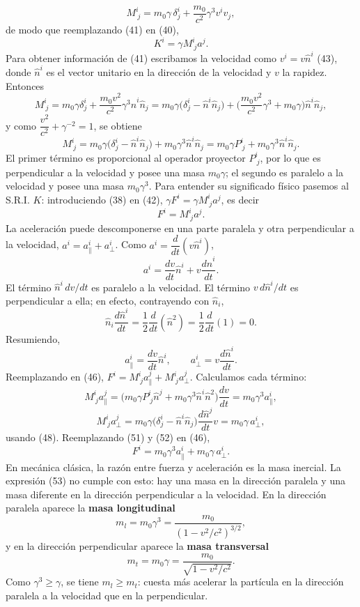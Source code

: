 \[
M^i_{\ j} = m_0\gamma\,\delta^i_j+\frac{m_0}{c^2}\gamma^3v^iv_j,
\tag{41}
\]
de modo que reemplazando (41) en (40),
\[
K^i = \gamma M^i_{\ j}a^j . \tag{42}
\]
Para obtener información de (41) escribamos la velocidad como
$v^i=v\hat n^i$ (43), donde $\hat n^i$ es el vector unitario en la
dirección de la velocidad y $v$ la rapidez. Entonces
\[
M^i_{\ j} = m_0\gamma\delta^i_j+\frac{m_0v^2}{c^2}\gamma^3\hat n^i\hat
n_j = m_0\gamma\big(\delta^i_j-\hat n^i\hat n_j\big)+\Big(\frac{m_0v^2}
{c^2}\gamma^3+m_0\gamma\Big)\hat n^i\hat n_j,
\]
y como $\dfrac{v^2}{c^2}+\gamma^{-2}=1$, se obtiene
\[
M^i_{\ j} = m_0\gamma\big(\delta^i_j-\hat n^i\hat n_j\big)+m_0\gamma^3
\hat n^i\hat n_j = m_0\gamma P^i_{\ j}+m_0\gamma^3\hat n^i\hat n_j .
\tag{44, 45}
\]
El primer término es proporcional al operador proyector $P^i_{\ j}$, por
lo que es perpendicular a la velocidad y posee una masa $m_0\gamma$; el
segundo es paralelo a la velocidad y posee una masa $m_0\gamma^3$. Para
entender su significado físico pasemos al S.R.I. $K$: introduciendo (38)
en (42), $\gamma F^i=\gamma M^i_{\ j}a^j$, es decir
\[
F^i = M^i_{\ j}a^j . \tag{46}
\]
La aceleración puede descomponerse en una parte paralela y otra
perpendicular a la velocidad, $a^i=a^i_\parallel+a^i_\perp$. Como
$a^i=\dfrac{d}{dt}(v\hat n^i)$,
\[
a^i = \frac{dv}{dt}\hat n^i+v\frac{d\hat n^i}{dt} . \tag{47}
\]
El término $\hat n^i\,dv/dt$ es paralelo a la velocidad. El término
$v\,d\hat n^i/dt$ es perpendicular a ella; en efecto, contrayendo con
$\hat n_i$,
\[
\hat n_i\frac{d\hat n^i}{dt} = \frac12\frac{d}{dt}(\hat n^2) = \frac12
\frac{d}{dt}(1) = 0. \tag{48}
\]
Resumiendo,
\[
a^i_\parallel = \frac{dv}{dt}\hat n^i, \qquad a^i_\perp = v\frac{d\hat
n^i}{dt}. \tag{49, 50}
\]
Reemplazando en (46), $F^i=M^i_{\ j}a^j_\parallel+M^i_{\ j}a^j_\perp$.
Calculamos cada término:
\[
M^i_{\ j}a^j_\parallel = \big(m_0\gamma P^i_{\ j}\hat n^j+m_0\gamma^3
\hat n^i\hat n^2\big)\frac{dv}{dt} = m_0\gamma^3a^i_\parallel, \tag{51}
\]
\[
M^i_{\ j}a^j_\perp = m_0\gamma\big(\delta^i_j-\hat n^i\hat n_j\big)
\frac{d\hat n^j}{dt}v = m_0\gamma\,a^i_\perp, \tag{52}
\]
usando (48). Reemplazando (51) y (52) en (46),
\[
F^i = m_0\gamma^3a^i_\parallel+m_0\gamma\,a^i_\perp . \tag{53}
\]
En mecánica clásica, la razón entre fuerza y aceleración es la masa
inercial. La expresión (53) no cumple con esto: hay una masa en la
dirección paralela y una masa diferente en la dirección perpendicular a
la velocidad. En la dirección paralela aparece la \textbf{masa
longitudinal}
\[
m_l = m_0\gamma^3 = \frac{m_0}{(1-v^2/c^2)^{3/2}}, \tag{54}
\]
y en la dirección perpendicular aparece la \textbf{masa transversal}
\[
m_t = m_0\gamma = \frac{m_0}{\sqrt{1-v^2/c^2}} . \tag{55}
\]
Como $\gamma^3\ge\gamma$, se tiene $m_l\ge m_t$: cuesta más acelerar la
partícula en la dirección paralela a la velocidad que en la
perpendicular.

